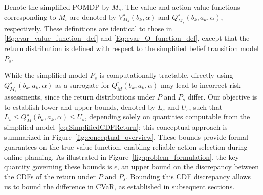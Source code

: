 \documentclass[acmlarge, manuscript, screen, review, natbib=false, oneside]{acmart}
\begin{document}
Denote the simplified POMDP by $M_s$. The value and action-value functions corresponding to $M_s$ are denoted by $V^{\pi}_{M_s}(b_k, \alpha)$ and $Q^{\pi}_{M_s}(b_k, a_k, \alpha)$, respectively. These definitions are identical to those in \eqref{Eq:cvar_value_function_def} and \eqref{Eq:cvar_Q_function_def}, except that the return distribution is defined with respect to the simplified belief transition model $P_s$.

While the simplified model $P_s$ is computationally tractable, directly using $Q^\pi_{M_s}(b_k, a_k, \alpha)$ as a surrogate for $Q^\pi_M(b_k, a_k, \alpha)$ may lead to incorrect risk assessments, since the return distributions under $P$ and $P_s$ differ. Our objective is to establish lower and upper bounds, denoted by $L_s$ and $U_s$, such that $L_s \leq Q_M^\pi(b_k, a_k, \alpha) \leq U_s$, depending solely on quantities computable from the simplified model~\eqref{eq:SimplifiedCDFReturn}; this conceptual approach is summarized in Figure~\ref{fig:conceptual_overview}. These bounds provide formal guarantees on the true value function, enabling reliable action selection during online planning. As illustrated in Figure~\ref{fig:problem_formulation}, the key quantity governing these bounds is $\epsilon$, an upper bound on the discrepancy between the CDFs of the return under $P$ and $P_s$. Bounding this CDF discrepancy allows us to bound the difference in CVaR, as established in subsequent sections.
\end{document}
